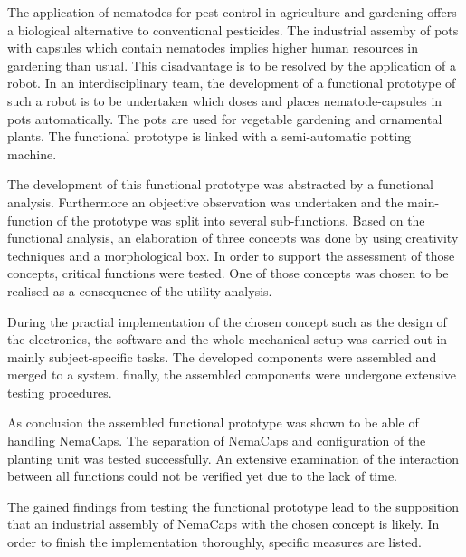 \newpage
The application of nematodes for pest control in agriculture and gardening offers a biological alternative to conventional pesticides. The industrial assemby of pots with capsules which contain nematodes implies higher human resources in gardening than usual. This disadvantage is to be resolved by the application of a robot. In an interdisciplinary team, the development of a functional prototype of such a robot is to be undertaken which doses and places nematode-capsules in pots automatically. The pots are used for vegetable gardening and ornamental plants. The functional prototype is linked with a semi-automatic potting machine.
\newline

The development of this functional prototype was abstracted by a functional analysis. Furthermore an objective observation was undertaken and the main-function of the prototype was split into several sub-functions. Based on the functional analysis, an elaboration of three concepts was done by using creativity techniques and a morphological box. In order to support the assessment of those concepts, critical functions were tested. One of those concepts was chosen to be realised as a consequence of the utility analysis.
\newline

During the practial implementation of the chosen concept such as the design of the electronics, the software and the whole mechanical setup was carried out in mainly subject-specific tasks. The developed components were assembled and merged to a system. finally, the assembled components were undergone extensive testing procedures.
\newline

As conclusion the assembled functional prototype was shown to be able of handling NemaCaps. The separation of NemaCaps and configuration of the planting unit was tested successfully. An extensive examination of the  interaction between all functions could not be verified yet due to the lack of time.
\newline

The gained findings from testing the functional prototype lead to the supposition that an industrial assembly of NemaCaps with the chosen concept is likely. In order to finish the implementation thoroughly, specific measures are listed.